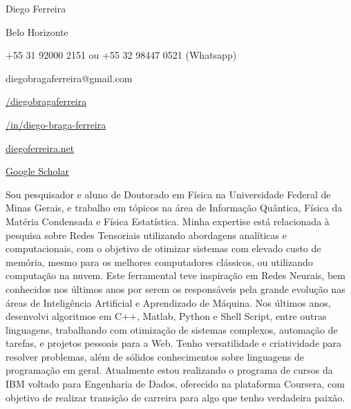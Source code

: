 \documentclass[a4paper,10pt]{article}
\newcommand{\cvnamestyle}[1]{{\Large\cvnamefont\textcolor{cvnamecolor}{#1}}}
\newlength{\cvafternameskipamount}
\newlength{\cvafterpersonalinfolineskipamount}
\newcommand{\cvname}[1]{
    \cvnamestyle{#1}
    \vspace{\cvafternameskipamount}}
\newcommand{\cvpersonalinfolinewithicon}[3]{
    \raisebox{.5\fontcharht\font`E-.5\height}{\texttt{[image: \#2]}}
    #3
    \vspace{\cvafterpersonalinfolineskipamount}}
\begin{document}
    {\cvname{Diego Ferreira}
    
    \cvpersonalinfolinewithicon{height=4.5mm}{globe.png}{Belo Horizonte} %
    
    \cvpersonalinfolinewithicon{height=4.5mm}{phone.png}{+55 31 92000 2151 ou +55 32 98447 0521 (Whatsapp)} %
    
    \cvpersonalinfolinewithicon{height=4.5mm}{envelope.png}{diegobragaferreira@gmail.com} %
        
    \cvpersonalinfolinewithicon{height=4.5mm}{github.png}{\href{https://github.com/diegobragaferreira}{/diegobragaferreira}}
    
    \cvpersonalinfolinewithicon{height=4.5mm}{linkedin.png}{\href{https://linkedin.com/in/diego-braga-ferreira}{/in/diego-braga-ferreira}}
    
    \cvpersonalinfolinewithicon{height=4.5mm}{website.png}{\href{https://diegoferreira.net}{diegoferreira.net}}
    
    \cvpersonalinfolinewithicon{height=4.5mm}{scholar.png}{\href{https://scholar.google.com/citations?user=6i7I6wUAAAAJ}{Google Scholar}}
    
    \vspace{0.4cm}
    \cvpersonalinfolinewithicon{height=4.5mm}{comment.png}{
    Sou pesquisador e aluno de Doutorado em Física na Universidade Federal de Minas Gerais, 
    e trabalho em tópicos na área de Informação Quântica, Física da Matéria Condensada e Física Estatística. 
    Minha expertise está relacionada à pesquisa sobre Redes Tensoriais utilizando abordagens analíticas e computacionais, 
    com o objetivo de otimizar sistemas com elevado custo de memória, mesmo para os melhores computadores clássicos, ou utilizando computação na nuvem. 
    Este ferramental teve inspiração em Redes Neurais, bem conhecidos nos últimos anos por serem os responsáveis pela grande evolução nas áreas de 
    Inteligência Artificial e Aprendizado de Máquina.
    \newline\newline
    Nos últimos anos, desenvolvi algoritmos em C++, Matlab, Python e Shell Script, entre outras linguagens, trabalhando com otimização 
    de sistemas complexos, automação de tarefas, e projetos pessoais para a Web.
    \newline\newline
    Tenho versatilidade e criatividade para resolver problemas, além de sólidos conhecimentos sobre linguagens de programação em geral.
    \newline\newline    
    Atualmente estou realizando o programa de cursos da IBM voltado para Engenharia de Dados, oferecido na plataforma Coursera, 
    com objetivo de realizar transição de carreira para algo que tenho verdadeira paixão.
    }}
    
\end{document}

